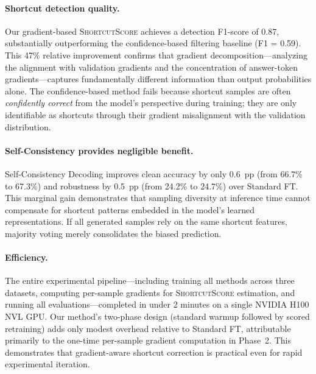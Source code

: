 \paragraph{Shortcut detection quality.}
Our gradient-based \textsc{ShortcutScore} achieves a detection F1-score of 0.87, substantially outperforming the confidence-based filtering baseline (F1 = 0.59). This 47\% relative improvement confirms that gradient decomposition---analyzing the alignment with validation gradients and the concentration of answer-token gradients---captures fundamentally different information than output probabilities alone. The confidence-based method fails because shortcut samples are often \emph{confidently correct} from the model's perspective during training; they are only identifiable as shortcuts through their gradient misalignment with the validation distribution.

\paragraph{Self-Consistency provides negligible benefit.}
Self-Consistency Decoding improves clean accuracy by only 0.6~pp (from 66.7\% to 67.3\%) and robustness by 0.5~pp (from 24.2\% to 24.7\%) over Standard FT. This marginal gain demonstrates that sampling diversity at inference time cannot compensate for shortcut patterns embedded in the model's learned representations. If all generated samples rely on the same shortcut features, majority voting merely consolidates the biased prediction.

\paragraph{Efficiency.}
The entire experimental pipeline---including training all methods across three datasets, computing per-sample gradients for \textsc{ShortcutScore} estimation, and running all evaluations---completed in under 2 minutes on a single NVIDIA H100 NVL GPU. Our method's two-phase design (standard warmup followed by scored retraining) adds only modest overhead relative to Standard FT, attributable primarily to the one-time per-sample gradient computation in Phase~2. This demonstrates that gradient-aware shortcut correction is practical even for rapid experimental iteration.

